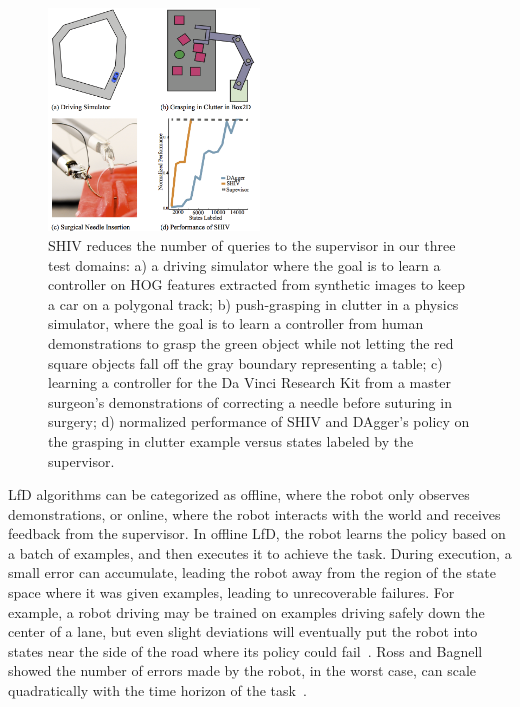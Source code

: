 \documentclass[10pt, conference]{ieeeconf}      %
\begin{document}
\begin{figure}[ht]
\centering
   
\includegraphics[width=0.5\textwidth]{figures/teaser.pdf}
\caption{ 
SHIV  reduces the number of queries to the supervisor in our three test domains: a) a driving simulator where the goal is to learn a controller on HOG features extracted from synthetic images to keep a car on a polygonal track; b) push-grasping in clutter in a physics simulator, where the goal is to learn a controller from human demonstrations to grasp the green object while not letting the red square objects fall off the gray boundary representing a table; c) learning a controller for the Da Vinci Research Kit from a master surgeon's demonstrations of correcting a needle before suturing in surgery; d) normalized performance of SHIV and DAgger's policy on the grasping in clutter example versus states labeled by the supervisor.
}
\vspace*{-10pt}
\label{fig:teaser}
\end{figure}




LfD algorithms can be categorized as offline, where the robot only observes demonstrations, or online, where the robot interacts with the world and receives feedback from the supervisor.
In offline LfD, the robot learns the policy based on a batch of examples, and then executes it to achieve the task.  During execution, a small error can accumulate, leading the robot away from the region of the state space where it was given examples, leading to unrecoverable failures.  For example, a robot driving may be trained on examples driving safely down the center of a lane, but even slight deviations will eventually put the robot into states near the side of the road where its policy could  fail~\cite{pomerleau1989alvinn}. Ross and Bagnell showed the number of errors made by the robot, in the worst case,  can scale quadratically with the time horizon of the task~\cite{ross2010efficient}.
\end{document}
